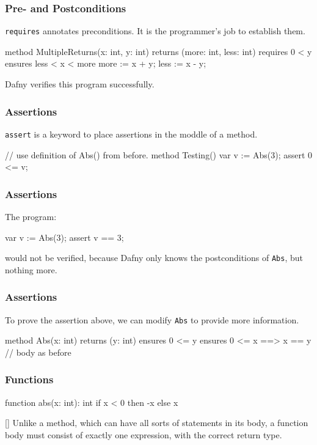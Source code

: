 \documentclass[10pt, compress]{beamer}
\begin{document}
\begin{frame}[fragile]
  \frametitle{Pre- and Postconditions}
  \verb|requires| annotates preconditions. It is the programmer's job to establish them.
  \begin{verbnobox}[\footnotesize]
method MultipleReturns(x: int, y: int)
returns (more: int, less: int)
   requires 0 < y
   ensures less < x < more
{
   more := x + y;
   less := x - y;
}

  \end{verbnobox}
  Dafny verifies this program successfully.

\end{frame}

\begin{frame}[fragile]
  \frametitle{Assertions}
  \verb|assert| is a keyword to place assertions in the moddle of a method.
  \begin{verbnobox}[\footnotesize]
// use definition of Abs() from before.
method Testing()
{
   var v := Abs(3);
   assert 0 <= v;
}
  \end{verbnobox}
\end{frame}

\begin{frame}[fragile]
  \frametitle{Assertions}

  The program:
  \begin{verbnobox}[\footnotesize]
var v := Abs(3);
assert v == 3;
  \end{verbnobox}
  would not be verified, because Dafny only knows the postconditions of \verb|Abs|, but nothing more.
\end{frame}

\begin{frame}[fragile]
  \frametitle{Assertions}
  To prove the assertion above, we can modify \verb|Abs| to provide more information.
  \begin{verbnobox}[\footnotesize]
method Abs(x: int) returns (y: int)
   ensures 0 <= y
   ensures 0 <= x ==> x == y
{
   // body as before
}
  \end{verbnobox}
\end{frame}

\begin{frame}[fragile]
  \frametitle{Functions}
  \begin{verbnobox}[\footnotesize]
function abs(x: int): int
{
   if x < 0 then -x else x
}
  \end{verbnobox}[\footnotesize]
  Unlike a method, which can have all sorts of statements in its body, a function body must consist of exactly one expression, with the correct return type.
\end{frame}
\end{document}
